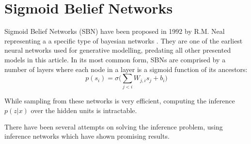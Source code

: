 \section{Sigmoid Belief Networks}
\label{sec:sbn}
Sigmoid Belief Networks (SBN) have been proposed in 1992 by R.M. Neal \cite{neal:1992} representing a a specific type of bayesian networks \cite{pearl:1985}.
They are one of the earliest neural networks used for generative modelling, predating all other presented models in this article.
In its most common form, SBNs are comprised by a number of layers where each node in a layer is a sigmoid function of its ancestors:
$$
p(s_i) = \sigma\bigg(\sum_{j<i}W_{j,i}s_j+b_i\bigg)
$$

While sampling from these networks is very efficient, computing the inference $p(z|x)$ over the hidden units is intractable.

There have been several attempts on solving the inference problem, using inference networks which have shown promising results.


